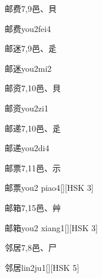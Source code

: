 \begin{entry}{邮费}{7,9}{⾢、⾙}
  \begin{phonetics}{邮费}{you2fei4}
  \end{phonetics}
\end{entry}

\begin{entry}{邮迷}{7,9}{⾢、⾡}
  \begin{phonetics}{邮迷}{you2mi2}
  \end{phonetics}
\end{entry}

\begin{entry}{邮资}{7,10}{⾢、⾙}
  \begin{phonetics}{邮资}{you2zi1}
  \end{phonetics}
\end{entry}

\begin{entry}{邮递}{7,10}{⾢、⾡}
  \begin{phonetics}{邮递}{you2di4}
  \end{phonetics}
\end{entry}

\begin{entry}{邮票}{7,11}{⾢、⽰}
  \begin{phonetics}{邮票}{you2 piao4}[][HSK 3]
  \end{phonetics}
\end{entry}

\begin{entry}{邮箱}{7,15}{⾢、⾋}
  \begin{phonetics}{邮箱}{you2 xiang1}[][HSK 3]
  \end{phonetics}
\end{entry}

\begin{entry}{邻居}{7,8}{⾢、⼫}
  \begin{phonetics}{邻居}{lin2ju1}[][HSK 5]
  \end{phonetics}
\end{entry}

